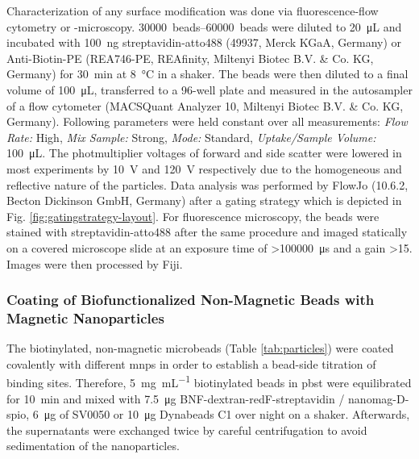 Characterization of any surface modification was done via fluorescence-flow cytometry or -microscopy. \SIrange{30000}{60000}{beads} were diluted to \SI{20}{\micro\liter} and incubated with \SI{100}{\nano\gram} streptavidin-atto488 (49937, Merck KGaA, Germany) or Anti-Biotin-PE (REA746-PE, REAfinity, Miltenyi Biotec B.V. \& Co. KG, Germany) for \SI{30}{\minute} at \SI{8}{\degreeCelsius} in a shaker. The beads were then diluted to a final volume of \SI{100}{\micro\liter}, transferred to a 96-well plate and measured in the autosampler of a flow cytometer (MACSQuant Analyzer 10, Miltenyi Biotec B.V. \& Co. KG, Germany). Following parameters were held constant over all measurements: \textit{Flow Rate:} High, \textit{Mix Sample:} Strong, \textit{Mode:} Standard, \textit{Uptake/Sample Volume:} \SI{100}{\micro\liter}. The photmultiplier voltages of forward and side scatter were lowered in most experiments by \SI{10}{\volt} and \SI{120}{\volt} respectively due to the homogeneous and reflective nature of the particles.
Data analysis was performed by FlowJo (10.6.2, Becton Dickinson GmbH, Germany) after a gating strategy which is depicted in Fig. \ref{fig:gatingstrategy-layout}. 
For fluorescence microscopy, the beads were stained with streptavidin-atto488 after the same procedure and imaged statically on a covered microscope slide at an exposure time of \SI{>100000}{\micro\second} and a gain \num{>15}. Images were then processed by Fiji.
\subsubsection{Coating of Biofunctionalized Non-Magnetic Beads with Magnetic Nanoparticles}
\label{sec:meth:coatingMNPs}
The biotinylated, non-magnetic microbeads (Table \ref{tab:particles}) were coated covalently with different \glspl{mnp} in order to establish a bead-side titration of binding sites. Therefore, \SI{5}{\milli\gram\per\milli\liter} biotinylated beads in \gls{pbst} were equilibrated for \SI{10}{\minute} and mixed with \SI{7.5}{\micro\gram} BNF-dextran-redF-streptavidin / nanomag-D-spio, \SI{6}{\micro\gram} of SV0050 or \SI{10}{\micro\gram} Dynabeads C1 over night on a shaker. Afterwards, the supernatants were exchanged twice by careful centrifugation to avoid sedimentation of the nanoparticles.


